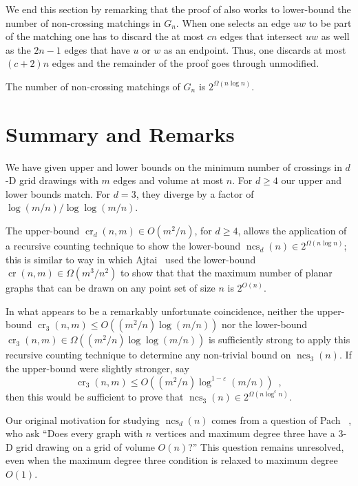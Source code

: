 \documentclass{patmorin}
\DeclareMathOperator{\crs}{cr}
\DeclareMathOperator{\ncs}{ncs}
\begin{document}
We end this section by remarking that the proof of 
also works to lower-bound the number of non-crossing matchings in $G_n$.
When one selects an edge $uw$ to be part of the matching one has to
discard the at most $cn$ edges that intersect $uw$ as well as the $2n-1$
edges that have $u$ or $w$ as an endpoint.  Thus, one discards at most
$(c+2)n$ edges and the remainder of the proof goes through unmodified.

\begin{cor}
  The number of non-crossing matchings of $G_n$ is $2^{\Omega(n\log n)}$.
\end{cor}



\section{Summary and Remarks}

We have given upper and lower bounds on the minimum number of crossings in
$d$-D grid drawings with $m$ edges and volume at most $n$.  For $d\ge 4$
our upper and lower bounds match.  For $d=3$, they diverge by a factor
of $\log(m/n)/\log\log(m/n)$.

The upper-bound $\crs_d(n,m)\in O(m^2/n)$, for $d\ge 4$, allows the
application of a recursive counting technique to show the lower-bound
$\ncs_d(n)\in 2^{\Omega(n\log n)}$; this is similar to way in which Ajtai
\etal\ used the lower-bound $\crs(n,m)\in\Omega(m^3/n^2)$ to show that
that the maximum number of planar graphs that can be drawn on any point
set of size $n$ is $2^{O(n)}$.

In what appears to be a remarkably unfortunate coincidence, neither the
upper-bound $\crs_3(n,m)\le O((m^2/n)\log (m/n))$ nor the lower-bound
$\crs_3(n,m)\in \Omega((m^2/n)\log\log(m/n))$ is sufficiently strong to
apply this recursive counting technique to determine any non-trivial
bound on $\ncs_3(n)$.  If the upper-bound were slightly stronger, say
\[
   \crs_3(n,m)\le O((m^2/n)\log^{1-\varepsilon}(m/n)) \enspace ,
\]
then this would be sufficient to prove that
$\ncs_3(n)\in2^{\Omega(n\log^{\epsilon} n)}$.

Our original motivation for studying $\ncs_d(n)$  comes from a question
of Pach \etal~\cite{pach.thiele.ea:three-dimensional}, who ask ``Does every
graph with $n$ vertices and maximum degree three have a 3-D grid drawing
on a grid of volume $O(n)$?''  This question remains unresolved, even when
the maximum degree three condition is relaxed to maximum degree $O(1)$.
\end{document}
